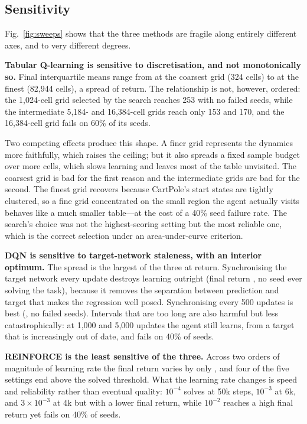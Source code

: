 \documentclass[conference]{IEEEtran}
\begin{document}
\subsection{Sensitivity}

Fig.~\ref{fig:sweeps} shows that the three methods are fragile along entirely
different axes, and to very different degrees.

\textbf{Tabular Q-learning is sensitive to discretisation, and not monotonically
so.} Final interquartile means range from \TabSweepWorstValue{} at the coarsest
grid (324 cells) to \TabSweepBestValue{} at the finest (82{,}944 cells), a spread
of \TabSweepSpread{} return. The relationship is not, however, ordered: the
1{,}024-cell grid selected by the search reaches 253 with no failed seeds, while
the intermediate 5{,}184- and 16{,}384-cell grids reach only 153 and 170, and the
16{,}384-cell grid fails on 60\% of its seeds.

Two competing effects produce this shape. A finer grid represents the dynamics
more faithfully, which raises the ceiling; but it also spreads a fixed sample
budget over more cells, which slows learning and leaves most of the table
unvisited. The coarsest grid is bad for the first reason and the intermediate
grids are bad for the second. The finest grid recovers because CartPole's start
states are tightly clustered, so a fine grid concentrated on the small region the
agent actually visits behaves like a much smaller table---at the cost of a 40\%
seed failure rate. The search's choice was not the highest-scoring setting but the
most reliable one, which is the correct selection under an area-under-curve
criterion.

\textbf{DQN is sensitive to target-network staleness, with an interior optimum.}
The spread is the largest of the three at \DqnSweepSpread{} return. Synchronising
the target network every update destroys learning outright (final return
\DqnSweepWorstValue{}, no seed ever solving the task), because it removes the
separation between prediction and target that makes the regression well posed.
Synchronising every 500 updates is best (\DqnSweepBestValue{}, no failed seeds).
Intervals that are too long are also harmful but less catastrophically: at 1{,}000
and 5{,}000 updates the agent still learns, from a target that is increasingly out
of date, and fails on 40\% of seeds.

\textbf{REINFORCE is the least sensitive of the three.} Across two orders of
magnitude of learning rate the final return varies by only \ReiSweepSpread{}, and
four of the five settings end above the solved threshold. What the learning rate
changes is speed and reliability rather than eventual quality: $10^{-4}$ solves at
50k steps, $10^{-3}$ at 6k, and $3\times10^{-3}$ at 4k but with a lower final
return, while $10^{-2}$ reaches a high final return yet fails on 40\% of seeds.
\end{document}
